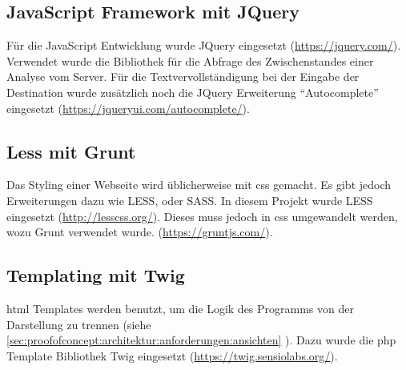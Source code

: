 \subsection{JavaScript Framework mit JQuery}
Für die JavaScript Entwicklung wurde JQuery eingesetzt (\url{https://jquery.com/}). Verwendet wurde die Bibliothek für die Abfrage des Zwischenstandes einer Analyse vom Server. Für die Textvervollständigung bei der Eingabe der Destination wurde zusätzlich noch die JQuery Erweiterung "`Autocomplete"' eingesetzt (\url{https://jqueryui.com/autocomplete/}).

\subsection{Less mit Grunt}
Das Styling einer Webseite wird üblicherweise mit \gls{css} gemacht. Es gibt jedoch Erweiterungen dazu wie LESS, oder SASS. In diesem Projekt wurde LESS eingesetzt (\url{http://lesscss.org/}). Dieses muss jedoch in \gls{css} umgewandelt werden, wozu Grunt verwendet wurde. (\url{https://gruntjs.com/}).

\subsection{Templating mit Twig}
\label{sec:proofofconcept:externebibliotheken:twig}
\gls{html} Templates werden benutzt, um die Logik des Programms von der Darstellung zu trennen (siehe \cref{sec:proofofconcept:architektur:anforderungen:ansichten} ). Dazu wurde die \gls{php} Template Bibliothek Twig eingesetzt (\url{https://twig.sensiolabs.org/}).

